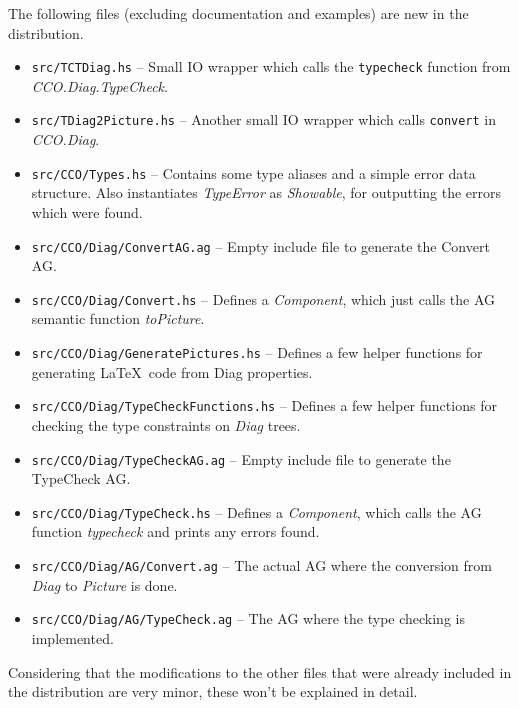 \documentclass[a4paper]{article}
\begin{document}
The following files (excluding documentation and examples) are new in the distribution. 

\begin{itemize}
    \item \texttt{src/TCTDiag.hs} -- Small IO wrapper which calls the \texttt{typecheck} function from \emph{CCO.Diag.TypeCheck}. 
    \item \texttt{src/TDiag2Picture.hs} -- Another small IO wrapper which calls \texttt{convert} in \emph{CCO.Diag}.
    \item \texttt{src/CCO/Types.hs} -- Contains some type aliases and a simple error data structure. Also instantiates \emph{TypeError} as \emph{Showable}, for outputting the errors which were found. 
    \item \texttt{src/CCO/Diag/ConvertAG.ag} -- Empty include file to generate the Convert AG.
    \item \texttt{src/CCO/Diag/Convert.hs} -- Defines a \emph{Component}, which just calls the AG semantic function \emph{toPicture}. 
    \item \texttt{src/CCO/Diag/GeneratePictures.hs} -- Defines a few helper functions for generating \LaTeX\ code from Diag properties.
    \item \texttt{src/CCO/Diag/TypeCheckFunctions.hs} -- Defines a few helper functions for checking the type constraints on \emph{Diag} trees. 
    \item \texttt{src/CCO/Diag/TypeCheckAG.ag} -- Empty include file to generate the TypeCheck AG.
    \item \texttt{src/CCO/Diag/TypeCheck.hs} -- Defines a \emph{Component}, which calls the AG function \emph{typecheck} and prints any errors found.
    \item \texttt{src/CCO/Diag/AG/Convert.ag} -- The actual AG where the conversion from \emph{Diag} to \emph{Picture} is done. 
    \item \texttt{src/CCO/Diag/AG/TypeCheck.ag} -- The AG where the type checking is implemented.
\end{itemize}

Considering that the modifications to the other files that were already included in the distribution are very minor, these won't be explained in detail. 
\end{document}
